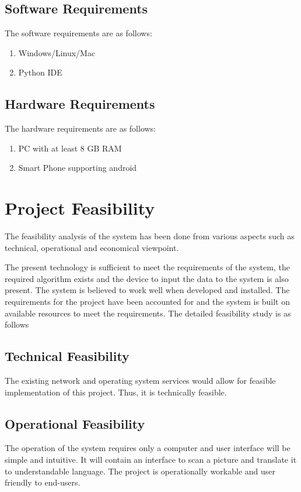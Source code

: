 \subsection{Software Requirements}
The software requirements are as follows:
\begin{enumerate}
\item Windows/Linux/Mac
\item Python IDE
\end{enumerate}

\subsection{Hardware Requirements}
The hardware requirements are as follows:
\begin{enumerate}
\item PC with at least 8 GB RAM
\item Smart Phone supporting android
\end{enumerate}
\label{tblSampleTable}

\section{Project Feasibility}
The feasibility analysis of the system has been done from various aspects such as technical, operational and economical viewpoint. \par
The present technology is sufficient to meet the requirements of the system, the required algorithm exists and the device to input the data to the system is also present. The system is believed to work well when developed and installed. The requirements for the project have been accounted for and the system is built on available resources to meet the requirements. The detailed feasibility study is as follows

\subsection{Technical Feasibility}
The existing network and operating system services would allow for feasible implementation of this project. Thus, it is technically feasible.

\subsection{Operational Feasibility}
The operation of the system requires only a computer and user interface will be simple and intuitive. It will contain an interface to scan a picture and translate it to understandable language. The project is operationally workable and user friendly to end-users.

